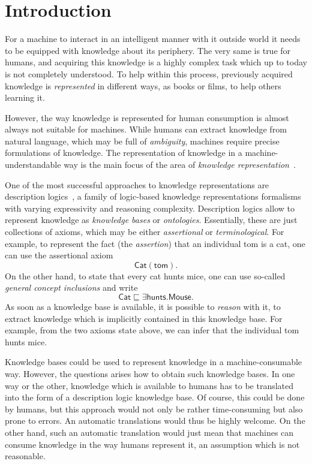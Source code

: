 \chapter{Introduction}
\label{cha:introduction}

For a machine to interact in an intelligent manner with it outside world it needs to be
equipped with knowledge about its periphery.  The very same is true for humans, and
acquiring this knowledge is a highly complex task which up to today is not completely
understood.  To help within this process, previously acquired knowledge is
\emph{represented} in different ways, \eg as books or films, to help others learning it.

However, the way knowledge is represented for human consumption is almost always not
suitable for machines.  While humans can extract knowledge from natural language, which
may be full of \emph{ambiguity}, machines require precise formulations of knowledge.  The
representation of knowledge in a machine-understandable way is the main focus of the area
of \emph{knowledge representation}~\cite{KRhandbook}.

One of the most successful approaches to knowledge representations are description
logics~\cite{DLhandbook}, a family of logic-based knowledge representations formalisms
with varying expressivity and reasoning complexity.  Description logics allow to represent
knowledge as \emph{knowledge bases} or \emph{ontologies}.  Essentially, these are just
collections of axioms, which may be either \emph{assertional} or \emph{terminological}.
For example, to represent the fact (the \emph{assertion}) that an individual \textsf{tom}
is a cat, one can use the assertional axiom
\begin{equation}
  \label{eq:14}
  \mathsf{Cat}(\mathsf{tom}).
\end{equation}
On the other hand, to state that every cat hunts mice, one can use so-called \emph{general
concept inclusions} and write
\begin{equation}
  \label{eq:15}
  \mathsf{Cat} \sqsubseteq \exists \mathsf{hunts}. \mathsf{Mouse}.
\end{equation}
As soon as a knowledge base is available, it is possible to \emph{reason} with it, \ie to
extract knowledge which is implicitly contained in this knowledge base.  For example, from
the two axioms state above, we can infer that the individual \textsf{tom} hunts mice.

Knowledge bases could be used to represent knowledge in a machine-consumable way.
However, the questions arises how to obtain such knowledge bases.  In one way or the
other, knowledge which is available to humans has to be translated into the form of a
description logic knowledge base.  Of course, this could be done by humans, but this
approach would not only be rather time-consuming but also prone to errors.  An automatic
translations would thus be highly welcome.  On the other hand, such an automatic
translation would just mean that machines can consume knowledge in the way humans
represent it, an assumption which is not reasonable.

